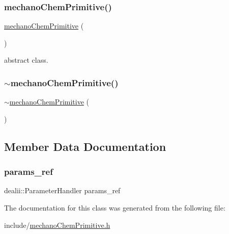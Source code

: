 \subsubsection{\texorpdfstring{mechanoChemPrimitive()}{mechanoChemPrimitive()}}
{\footnotesize\ttfamily \mbox{\hyperlink{classmechano_chem_primitive}{mechano\+Chem\+Primitive}} (\begin{DoxyParamCaption}{ }\end{DoxyParamCaption})\hspace{0.3cm}{\ttfamily [inline]}}

abstract class. \mbox{\label{classmechano_chem_primitive_a75af109e7881383b100372d5c9121ee9}} 
\subsubsection{\texorpdfstring{$\sim$mechanoChemPrimitive()}{~mechanoChemPrimitive()}}
{\footnotesize\ttfamily $\sim$\mbox{\hyperlink{classmechano_chem_primitive}{mechano\+Chem\+Primitive}} (\begin{DoxyParamCaption}{ }\end{DoxyParamCaption})\hspace{0.3cm}{\ttfamily [inline]}}



\subsection{Member Data Documentation}
\mbox{\label{classmechano_chem_primitive_a346c15877bf81bdb4fd274d71a73d7da}} 
\subsubsection{\texorpdfstring{params\_ref}{params\_ref}}
{\footnotesize\ttfamily dealii\+::\+Parameter\+Handler params\+\_\+ref}



The documentation for this class was generated from the following file\+:\begin{DoxyCompactItemize}
\item 
include/\mbox{\hyperlink{mechano_chem_primitive_8h}{mechano\+Chem\+Primitive.\+h}}\end{DoxyCompactItemize}
